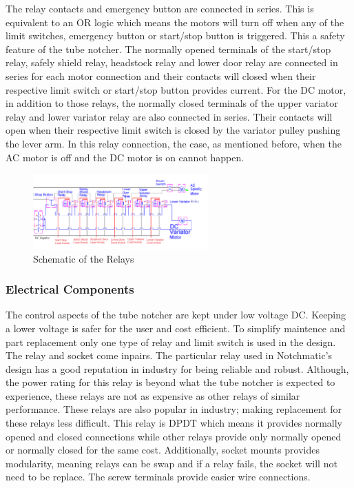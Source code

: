 The relay contacts and emergency button are connected in series. This is equivalent to an OR logic which means the motors will turn off when any of the limit switches, emergency button or start/stop button is triggered. This a safety feature of the tube notcher. 
The normally opened terminals of the start/stop relay, safely shield relay, headstock relay and lower door relay are connected in series for each motor connection and their contacts will closed  when their respective limit switch or start/stop button provides current. 
For the DC motor, in addition to those relays, the normally closed terminals of the upper variator relay and lower variator relay are also connected in series. Their contacts will open when their respective limit switch is closed by the variator pulley pushing the lever arm.
In this relay connection, the case, as mentioned before, when the AC motor is off and the DC motor is on cannot happen. 
\begin{figure}[H]
    \centering
    \includegraphics[width=0.6\textwidth]{./fall-report pictures/Chapter2-MachineDescription/Relays}
    \caption{Schematic of the Relays}
    \label{fig:Electrical:Relays}
\end{figure} 

\subsubsection{Electrical Components}
The control aspects of the tube notcher are kept under low voltage DC. Keeping a lower voltage is safer for the user and cost efficient. To simplify maintence and part replacement only one type of relay and limit switch is used in the design. The relay and socket come inpairs. The particular relay used in Notchmatic's design has a good reputation in industry for being reliable and robust. Although, the power rating for this relay is beyond what the tube notcher is expected to experience, these relays are not as expensive as other relays of similar performance. These relays are also popular in industry; making replacement for these relays less difficult. This relay is DPDT which means it provides normally opened and closed connections while other relays provide only normally opened or normally closed for the same cost. Additionally, socket mounts provides modularity, meaning relays can be swap and if a relay fails, the socket will not need to be replace. The screw terminals provide easier wire connections.

